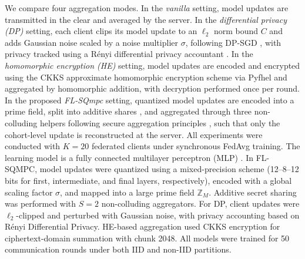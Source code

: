 \documentclass[journal,twoside,web]{ieeecolor}
\begin{document}
We compare four aggregation modes. In the \emph{vanilla} setting, model updates are transmitted in the clear and averaged by the server. In the \emph{differential privacy (DP)} setting, each client clips its model update to an $\ell_2$ norm bound $C$ and adds Gaussian noise scaled by a noise multiplier $\sigma$, following DP-SGD \cite{abadi2016dp}, with privacy tracked using a R\'enyi differential privacy accountant \cite{mironov2017rdp}. In the \emph{homomorphic encryption (HE)} setting, model updates are encoded and encrypted using the CKKS approximate homomorphic encryption scheme \cite{cheon2017ckks} via Pyfhel and aggregated by homomorphic addition, with decryption performed once per round. In the proposed \emph{FL-SQmpc} setting, quantized model updates are encoded into a prime field, split into additive shares \cite{shamir1979}, and aggregated through three non-colluding helpers following secure aggregation principles \cite{bonawitz2017secureagg}, such that only the cohort-level update is reconstructed at the server.
All experiments were conducted with $K=20$ federated clients under synchronous FedAvg training. The learning model is a fully connected multilayer perceptron (MLP) . In FL-SQMPC, model updates were quantized using a mixed-precision scheme (12–8–12 bits for first, intermediate, and final layers, respectively), encoded with a global scaling factor $\sigma$, and mapped into a large prime field $\mathbb{Z}_M$. Additive secret sharing was performed with $S=2$ non-colluding aggregators. For DP, client updates were $\ell_2$-clipped and perturbed with Gaussian noise, with privacy accounting based on Rényi Differential Privacy. HE-based aggregation used CKKS encryption for ciphertext-domain summation with chunk 2048. All models were trained for 50 communication rounds under both IID and non-IID partitions.
\end{document}
